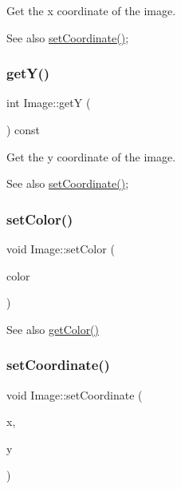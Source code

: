 Get the x coordinate of the image. 

\begin{DoxySeeAlso}{See also}
\mbox{\hyperlink{class_image_a6ad9872152db648945187482768ac590}{set\+Coordinate()}}; 
\end{DoxySeeAlso}
\mbox{\label{class_image_a82a57f3d6ce6cef4a07bb9d4e4903ba0}} 
\subsubsection{\texorpdfstring{get\+Y()}{getY()}}
{\footnotesize\ttfamily int Image\+::getY (\begin{DoxyParamCaption}{ }\end{DoxyParamCaption}) const}



Get the y coordinate of the image. 

\begin{DoxySeeAlso}{See also}
\mbox{\hyperlink{class_image_a6ad9872152db648945187482768ac590}{set\+Coordinate()}}; 
\end{DoxySeeAlso}
\mbox{\label{class_image_a642f5f8c346c881c7d7cbbd2eb3de7ca}} 
\subsubsection{\texorpdfstring{set\+Color()}{setColor()}}
{\footnotesize\ttfamily void Image\+::set\+Color (\begin{DoxyParamCaption}\item[{const \mbox{\hyperlink{class_r_g_b_color}{R\+G\+B\+Color}} \&}]{color }\end{DoxyParamCaption})}

\begin{DoxySeeAlso}{See also}
\mbox{\hyperlink{class_image_aec79ea5d2bc5177e1c7ad43fdc19feca}{get\+Color()}} 
\end{DoxySeeAlso}
\mbox{\label{class_image_a6ad9872152db648945187482768ac590}} 
\subsubsection{\texorpdfstring{set\+Coordinate()}{setCoordinate()}}
{\footnotesize\ttfamily void Image\+::set\+Coordinate (\begin{DoxyParamCaption}\item[{const int \&}]{x,  }\item[{const int \&}]{y }\end{DoxyParamCaption})}



